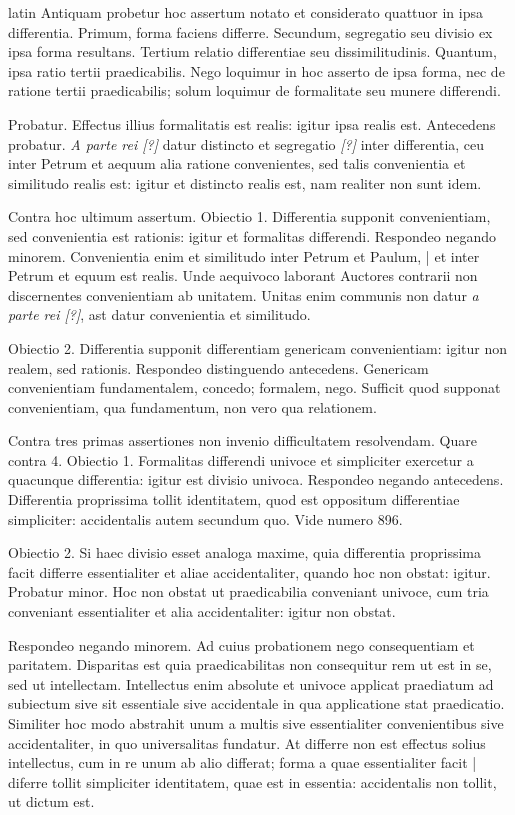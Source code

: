 \begin{otherlanguage*}{latin}
\pstart
 Antiquam probetur hoc assertum notato et considerato quattuor in ipsa differentia. Primum, forma faciens differre. Secundum, segregatio seu divisio ex ipsa forma resultans. Tertium relatio differentiae seu dissimilitudinis. Quantum, ipsa ratio tertii praedicabilis. Nego loquimur in hoc asserto de ipsa forma, nec de ratione tertii praedicabilis; solum loquimur de formalitate seu munere differendi. 
\pend

\pstart
 Probatur. Effectus illius formalitatis est realis: igitur ipsa realis est. Antecedens probatur. \emph{A parte rei [?]} datur distincto et segregatio \emph{ [?]} inter differentia, ceu inter Petrum et aequum alia ratione convenientes, sed talis convenientia et similitudo realis est: igitur et distincto realis est, nam realiter non sunt idem. 
\pend

\pstart
 Contra hoc ultimum assertum. Obiectio 1. Differentia supponit convenientiam, sed convenientia est rationis: igitur et formalitas differendi. Respondeo negando minorem. Convenientia enim et similitudo inter Petrum et Paulum, \textnormal{|}   et inter Petrum et equum est realis. Unde aequivoco laborant Auctores contrarii non discernentes convenientiam ab unitatem. Unitas enim communis non datur \emph{a parte rei [?]}, ast datur convenientia et similitudo. 
\pend

\pstart
 Obiectio 2. Differentia supponit differentiam genericam convenientiam: igitur non realem, sed rationis. Respondeo distinguendo antecedens. Genericam convenientiam fundamentalem, concedo; formalem, nego. Sufficit quod supponat convenientiam, qua fundamentum, non vero qua relationem. 
\pend

\pstart
 Contra tres primas assertiones non invenio difficultatem resolvendam. Quare contra 4. Obiectio 1. Formalitas differendi univoce et simpliciter exercetur a quacunque differentia: igitur est divisio univoca. Respondeo negando antecedens. Differentia proprissima tollit identitatem, quod est oppositum differentiae simpliciter: accidentalis autem secundum quo. Vide numero 896. 
\pend

\pstart
 Obiectio 2. Si haec divisio esset analoga maxime, quia differentia proprissima facit differre essentialiter et aliae accidentaliter, quando hoc non obstat: igitur. Probatur minor. Hoc non obstat ut praedicabilia conveniant univoce, cum tria conveniant essentialiter et alia accidentaliter: igitur non obstat. 
\pend

\pstart
 Respondeo negando minorem. Ad cuius probationem nego consequentiam et paritatem. Disparitas est quia praedicabilitas non consequitur rem ut est in se, sed ut intellectam. Intellectus enim absolute et univoce applicat praediatum ad subiectum sive sit essentiale sive accidentale in qua applicatione stat praedicatio. Similiter hoc modo abstrahit unum a multis sive essentialiter convenientibus sive accidentaliter, in quo universalitas fundatur. At differre non est effectus solius intellectus, cum in re unum ab alio differat; forma a quae essentialiter facit \textnormal{|} diferre tollit simpliciter identitatem, quae est in essentia: accidentalis non tollit, ut dictum est. 
\pend


\end{otherlanguage*}
